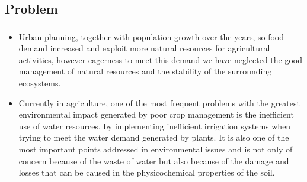 \subsection{Problem}
\begin{frame}
	\frametitle{\subsecname}
	\begin{minipage}{0.6\textwidth}
		\begin{itemize}
			\item

			      Urban planning, together with population growth
			      over the years, so food demand increased and exploit more natural resources for agricultural activities,
			      however eagerness to meet this demand we have neglected the good management of natural resources and the stability
			      of the surrounding ecosystems. \cite{Latham1997}

			\item

			      Currently in agriculture, one of the most frequent problems with the greatest environmental impact generated by poor crop management is the inefficient use of water resources, by implementing inefficient irrigation systems when trying to meet the water demand generated by plants. It is also one of the most important points addressed in environmental issues and is not only of concern because of the waste of water but also because of the damage and losses that can be caused in the physicochemical properties of the soil.


\end{itemize}
\end{minipage}
\end{frame}
